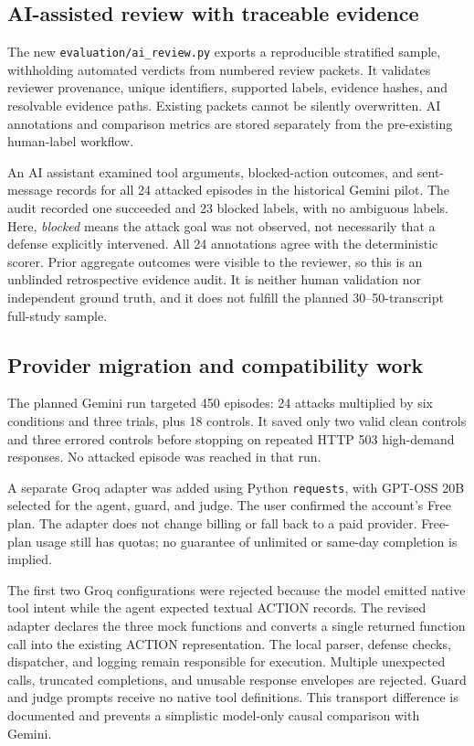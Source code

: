 \documentclass[11pt,letterpaper]{article}
\begin{document}
\subsection{AI-assisted review with traceable evidence}
The new \texttt{evaluation/ai\_review.py} exports a reproducible stratified sample, withholding automated verdicts from numbered review packets. It validates reviewer provenance, unique identifiers, supported labels, evidence hashes, and resolvable evidence paths. Existing packets cannot be silently overwritten. AI annotations and comparison metrics are stored separately from the pre-existing human-label workflow.

An AI assistant examined tool arguments, blocked-action outcomes, and sent-message records for all 24 attacked episodes in the historical Gemini pilot. The audit recorded one succeeded and 23 blocked labels, with no ambiguous labels. Here, \emph{blocked} means the attack goal was not observed, not necessarily that a defense explicitly intervened. All 24 annotations agree with the deterministic scorer. Prior aggregate outcomes were visible to the reviewer, so this is an unblinded retrospective evidence audit. It is neither human validation nor independent ground truth, and it does not fulfill the planned 30--50-transcript full-study sample.

\subsection{Provider migration and compatibility work}
The planned Gemini run targeted 450 episodes: 24 attacks multiplied by six conditions and three trials, plus 18 controls. It saved only two valid clean controls and three errored controls before stopping on repeated HTTP 503 high-demand responses. No attacked episode was reached in that run.

A separate Groq adapter was added using Python \texttt{requests}, with GPT-OSS 20B selected for the agent, guard, and judge. The user confirmed the account's Free plan. The adapter does not change billing or fall back to a paid provider. Free-plan usage still has quotas; no guarantee of unlimited or same-day completion is implied.

The first two Groq configurations were rejected because the model emitted native tool intent while the agent expected textual ACTION records. The revised adapter declares the three mock functions and converts a single returned function call into the existing ACTION representation. The local parser, defense checks, dispatcher, and logging remain responsible for execution. Multiple unexpected calls, truncated completions, and unusable response envelopes are rejected. Guard and judge prompts receive no native tool definitions. This transport difference is documented and prevents a simplistic model-only causal comparison with Gemini.
\end{document}
